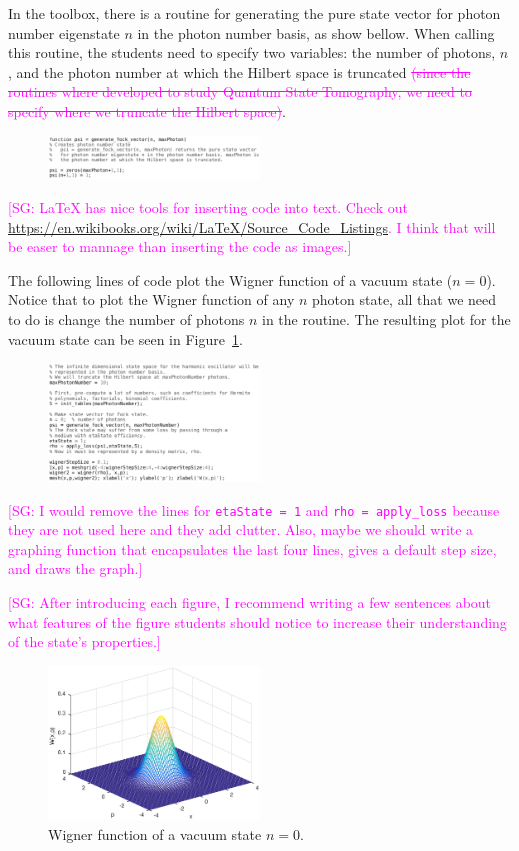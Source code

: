 \documentclass[twocolumn]{rbef}
\providecommand{\aucmnt}[1]{#1}
\providecommand{\editcolor}[2]{\textcolor{#1}{#2}}
\providecommand{\aucmnt}[1]{}
\providecommand{\editcolor}[2]{#2}
\newcommand{\SGs}[1]{\aucmnt{\editcolor{magenta}{\sout{#1}}}}
\newcommand{\SGc}[1]{\aucmnt{\editcolor{magenta}{[SG: #1]}}}
\begin{document}
In the toolbox, there is a routine for generating the pure state vector for photon number eigenstate $n$ in the photon number basis, as show bellow. When calling this routine, the students need to specify two variables: the number of photons, $n$, and the photon number at which the Hilbert space is truncated \SGs{(since the routines where developed to study Quantum State Tomography, we need to specify where we truncate the Hilbert space)}.
\begin{figure}[h]
\includegraphics[width=0.5\textwidth]{generate_fock_vector1.eps}
\end{figure}

\SGc{LaTeX has nice tools for inserting code into text.  Check out
  \url{https://en.wikibooks.org/wiki/LaTeX/Source_Code_Listings}.
  I think that will be easer to mannage than inserting the code as
  images.}

The following lines of code plot the Wigner function of a vacuum state ($n =0$). Notice that to plot the Wigner function of any $n$ photon state, all that we need to do is change the number of photons $n$ in the routine. The resulting plot for the vacuum state can be seen in Figure~\ref{fig-W-n=0}.
\begin{figure}[h]
\includegraphics[width=0.5\textwidth]{generate_fock_vector2.eps}
\end{figure}
\SGc{I would remove the lines for \texttt{etaState = 1} and \texttt{rho = apply\_loss}
  because they are not used here and they add clutter.  Also, maybe
  we should write a graphing function that encapsulates the last four
  lines, gives a default step size, and draws the graph.}

\SGc{After introducing each figure, I recommend writing a few
  sentences about what features of the figure students should notice
  to increase their understanding of the state's properties.}
\begin{figure}[h]
\includegraphics[width=0.5\textwidth]{fockn=0.eps}
\caption{Wigner function of a vacuum state $n=0$.}
\label{fig-W-n=0}
\end{figure}
\end{document}
